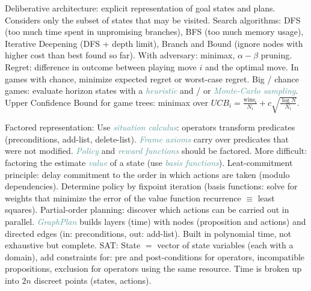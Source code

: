 \documentclass[10pt,a4paper,landscape]{article}
\newcommand{\concept}[1]{\textcolor{Emerald}{#1}} %
\newcommand{\subconcept}[1]{\textcolor{CadetBlue}{\textit{#1}}}
\newcommand{\opt}[1]{#1}
\renewcommand{\opt}[1]{}
\renewcommand{\section}[1]{
    \vspace{-0.3cm}
    \begin{center}
      \color{Bittersweet}
      \hrulefill{\small~~#1~~}\hrulefill
    \end{center}
    \vspace{-0.3cm}
  }
\begin{document}
\begin{multicols*}{4}
\concept{Deliberative architecture}: explicit representation of goal states and plans. Considers only the subset of states that may be visited.
\concept{Search algorithms}: DFS (too much time spent in unpromising branches), BFS (too much memory usage), Iterative Deepening (DFS + depth limit), Branch and Bound (ignore nodes with higher cost than best found so far). With adversary: minimax, $\alpha-\beta$ pruning.
\concept{Regret}: difference in outcome between playing move $i$ and the optimal move. In games with chance, minimize expected regret or worst-case regret.
Big / chance games: evaluate horizon states with a \subconcept{heuristic} and / or \subconcept{Monte-Carlo sampling}.
\concept{Upper Confidence Bound} for game trees: minimax over $UCB_i = \frac{\text{wins}_i}{N_i} + c \sqrt{\frac{\log{N}}{N_i}}$\opt{ ($c$: exploration parameter)}.

\concept{Factored representation}:\opt{ circumvent state space explosion by modeling state features as predicates.} Use \subconcept{situation calculus}: operators transform predicates (preconditions, add-list, delete-list). \subconcept{Frame axioms} carry over predicates that were not modified.
\subconcept{Policy} and \subconcept{reward functions} should be factored. More difficult: factoring the estimate \subconcept{value} of a state (use \subconcept{basis functions}).
\concept{Leat-commitment principle}: delay commitment to the order in which actions are taken (modulo dependencies). Determine policy by fixpoint iteration (basis functions: solve for weights that minimize the error of the value function recurrence $\equiv$ least squares).
\concept{Partial-order planning}: discover which actions can be carried out in parallel.
\subconcept{GraphPlan} builds layers (time) with nodes (proposition and actions) and directed edges (in: preconditions, out: add-list). Built in polynomial time, not exhaustive but complete.
\concept{SAT}:\opt{ goal state search can be encoded as a CSP.} State $=$ vector of state variables (each with a domain), add constraints for: pre and post-conditions for operators, incompatible propositions, exclusion for operators using the same resource. Time is broken up into $2n$ discreet points (states, actions).

\section{Multiagent systems}


\end{multicols*}
\end{document}
